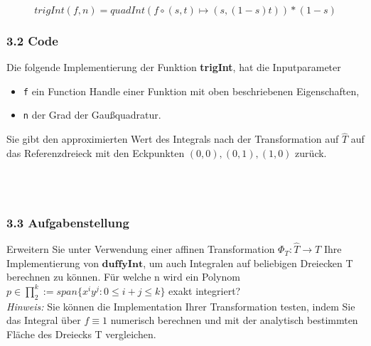 \documentclass[a4paper,11pt,bibliography=totoc,listof=totoc,headinclude=true,cleardoublepage=empty,oneside]{scrbook}
\newcommand{\code}[1]{\texttt{\color{change}#1}}
\begin{document}
		\begin{equation}
		trigInt(f,n) = quadInt(f\circ(s,t) \mapsto (s,(1-s)t))*(1-s)
		\end{equation}
		
		
		

		\vspace{4mm}		
	
		
		
		\color{change2}
		\subsubsection{3.2 Code}
		Die folgende Implementierung der Funktion \textbf{trigInt}, hat die Inputparameter
		\begin{itemize}
			\item \code{f} ein Function Handle einer Funktion mit oben beschriebenen Eigenschaften,
			\item \code{n} der Grad der Gaußquadratur.
		\end{itemize} 
		Sie gibt den approximierten Wert des Integrals nach der Transformation auf  $\hat{T}$ auf das Referenzdreieck mit den Eckpunkten $(0,0),(0,1),(1,0)$ zurück.
		
\color{change}
		\lstset{ 
			language=Matlab, 
			showstringspaces=false}
		
		 
		\begin{lstlisting} 
		
		
		\end{lstlisting}
		
	\color{change2}
		
		
		\subsubsection{3.3 Aufgabenstellung}
		\vspace{1mm}
		
		
		 Erweitern Sie unter Verwendung einer affinen Transformation $\Phi_T:\hat{T} \to T$ Ihre Implementierung von $\textbf{duffyInt}$, um auch Integralen auf beliebigen Dreiecken T berechnen zu können. 
		Für welche n wird ein Polynom $ p \in \prod_{2}^k:=span\{x^iy^j:0 \leq i+j\leq k \} $ exakt integriert? \\
		
		\vspace{-3mm}
		\textit{Hinweis:} Sie können die Implementation Ihrer Transformation testen, indem Sie das Integral über $f \equiv1$ numerisch berechnen und mit der analytisch bestimmten Fläche des Dreiecks T vergleichen.
		
\end{document}
